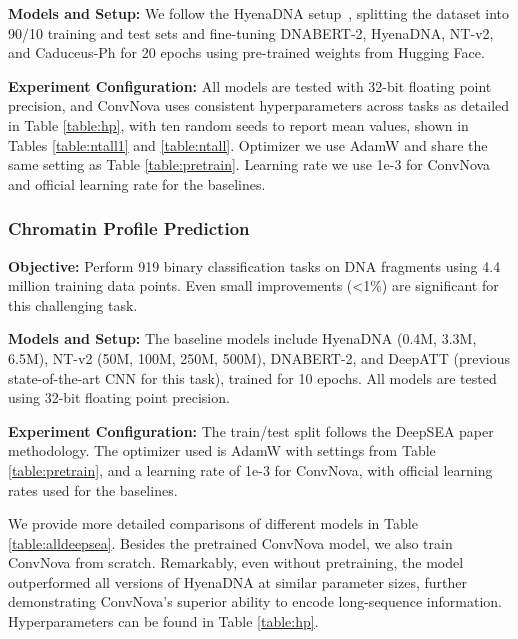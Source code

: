 \textbf{Models and Setup:} We follow the HyenaDNA setup~\citep{nguyen2024hyenadna}, splitting the dataset into 90/10 training and test sets and fine-tuning DNABERT-2, HyenaDNA, NT-v2, and Caduceus-Ph for 20 epochs using pre-trained weights from Hugging Face.

\textbf{Experiment Configuration:} All models are tested with 32-bit floating point precision, and ConvNova uses consistent hyperparameters across tasks as detailed in Table \ref{table:hp}, with ten random seeds to report mean values, shown in Tables \ref{table:ntall1} and \ref{table:ntall}. Optimizer we use AdamW and share the same setting as Table \ref{table:pretrain}. Learning rate we use 1e-3 for ConvNova and official learning rate for the baselines.

\subsubsection{Chromatin Profile Prediction}\label{app:deepsea}
\textbf{Objective:} Perform 919 binary classification tasks on DNA fragments using 4.4 million training data points. Even small improvements (<1\%) are significant for this challenging task.

\textbf{Models and Setup:} The baseline models include HyenaDNA (0.4M, 3.3M, 6.5M), NT-v2 (50M, 100M, 250M, 500M), DNABERT-2, and DeepATT (previous state-of-the-art CNN for this task), trained for 10 epochs. All models are tested using 32-bit floating point precision.

\textbf{Experiment Configuration:} The train/test split follows the DeepSEA paper methodology. The optimizer used is AdamW with settings from Table \ref{table:pretrain}, and a learning rate of 1e-3 for ConvNova, with official learning rates used for the baselines.

We provide more detailed comparisons of different models in Table \ref{table:alldeepsea}. Besides the pretrained ConvNova model, we also train ConvNova from scratch. Remarkably, even without pretraining, the model outperformed all versions of HyenaDNA at similar parameter sizes, further demonstrating ConvNova's superior ability to encode long-sequence information. Hyperparameters can be found in Table \ref{table:hp}.

